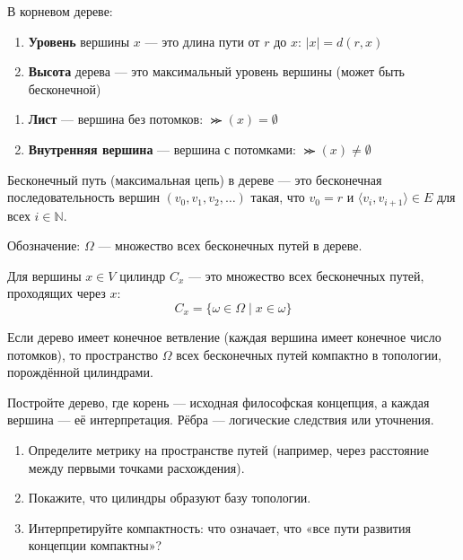 \documentclass[11pt, a4paper]{extarticle}
\newcommand{\om}{\omega}
\newcommand{\Om}{\Omega}
\newcommand{\N}{{\mathbb N}}
\begin{document}
\begin{definition}
В корневом дереве:
\begin{enumerate}
    \item \textbf{Уровень} вершины $x$ --- это длина пути от $r$ до $x$: $|x| = d(r, x)$
    \item \textbf{Высота} дерева --- это максимальный уровень вершины (может быть бесконечной)
\end{enumerate}
\end{definition}

\begin{definition}
\begin{enumerate}
    \item \textbf{Лист} --- вершина без потомков: $\Succ(x) = \emptyset$
    \item \textbf{Внутренняя вершина} --- вершина с потомками: $\Succ(x) \neq \emptyset$
\end{enumerate}
\end{definition}

\begin{definition}
Бесконечный путь (максимальная цепь) в дереве --- это бесконечная последовательность вершин $(v_0, v_1, v_2, \ldots)$ такая, что $v_0 = r$ и $\langle v_i, v_{i+1} \rangle \in E$ для всех $i \in \N$.

Обозначение: $\Om$ --- множество всех бесконечных путей в дереве.
\end{definition}

\begin{definition}[Цилиндр]
Для вершины $x \in V$ цилиндр $C_x$ --- это множество всех бесконечных путей, проходящих через $x$:
$$C_x = \{\om \in \Om \mid x \in \om\}$$
\end{definition}

\begin{theorem}
Если дерево имеет конечное ветвление (каждая вершина имеет конечное число потомков), то пространство $\Om$ всех бесконечных путей компактно в топологии, порождённой цилиндрами.
\end{theorem}

\begin{exercise}
Постройте дерево, где корень --- исходная философская концепция, а каждая вершина --- её интерпретация. Рёбра --- логические следствия или уточнения.
\begin{enumerate}
    \item Определите метрику на пространстве путей (например, через расстояние между первыми точками расхождения).
    \item Покажите, что цилиндры образуют базу топологии.
    \item Интерпретируйте компактность: что означает, что «все пути развития концепции компактны»?
\end{enumerate}
\end{exercise}
\end{document}
